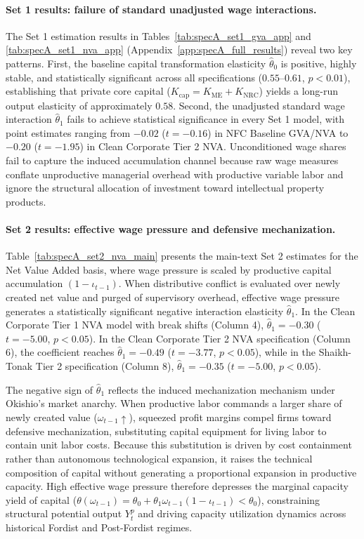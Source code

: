 \paragraph{Set 1 results: failure of standard unadjusted wage interactions.}
The Set 1 estimation results in Tables~\ref{tab:specA_set1_gva_app} and \ref{tab:specA_set1_nva_app} (Appendix~\ref{app:specA_full_results}) reveal two key patterns. First, the baseline capital transformation elasticity $\hat{\theta}_0$ is positive, highly stable, and statistically significant across all specifications ($0.55$--$0.61$, $p < 0.01$), establishing that private core capital ($K_{\text{cap}} = K_{\text{ME}} + K_{\text{NRC}}$) yields a long-run output elasticity of approximately $0.58$. Second, the unadjusted standard wage interaction $\hat{\theta}_1$ fails to achieve statistical significance in every Set 1 model, with point estimates ranging from $-0.02$ ($t = -0.16$) in NFC Baseline GVA/NVA to $-0.20$ ($t = -1.95$) in Clean Corporate Tier 2 NVA. Unconditioned wage shares fail to capture the induced accumulation channel because raw wage measures conflate unproductive managerial overhead with productive variable labor and ignore the structural allocation of investment toward intellectual property products.

\paragraph{Set 2 results: effective wage pressure and defensive mechanization.}
Table~\ref{tab:specA_set2_nva_main} presents the main-text Set 2 estimates for the Net Value Added basis, where wage pressure is scaled by productive capital accumulation $(1 - \iota_{t-1})$. When distributive conflict is evaluated over newly created net value and purged of supervisory overhead, effective wage pressure generates a statistically significant negative interaction elasticity $\hat{\theta}_1$. In the Clean Corporate Tier 1 NVA model with break shifts (Column 4), $\hat{\theta}_1 = -0.30$ ($t = -5.00$, $p < 0.05$). In the Clean Corporate Tier 2 NVA specification (Column 6), the coefficient reaches $\hat{\theta}_1 = -0.49$ ($t = -3.77$, $p < 0.05$), while in the Shaikh-Tonak Tier 2 specification (Column 8), $\hat{\theta}_1 = -0.35$ ($t = -5.00$, $p < 0.05$).

The negative sign of $\hat{\theta}_1$ reflects the induced mechanization mechanism under Okishio's market anarchy. When productive labor commands a larger share of newly created value ($\omega_{t-1} \uparrow$), squeezed profit margins compel firms toward defensive mechanization, substituting capital equipment for living labor to contain unit labor costs. Because this substitution is driven by cost containment rather than autonomous technological expansion, it raises the technical composition of capital without generating a proportional expansion in productive capacity. High effective wage pressure therefore depresses the marginal capacity yield of capital ($\theta(\omega_{t-1}) = \theta_0 + \theta_1 \omega_{t-1}(1-\iota_{t-1}) < \theta_0$), constraining structural potential output $Y_t^p$ and driving capacity utilization dynamics across historical Fordist and Post-Fordist regimes.

